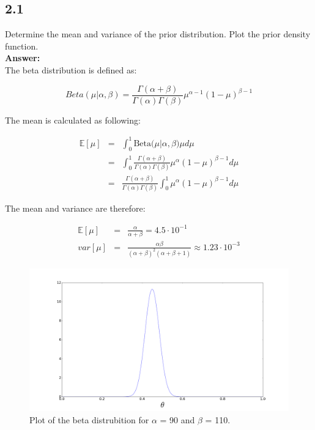\documentclass[a4paper]{article}
\begin{document}
\subsection*{2.1}

Determine the mean and variance of the prior distribution. Plot the prior density function.\\

\textbf{Answer:}\\


The beta distribution is defined as:


\begin{equation}
Beta(\mu|\alpha, \beta) = \frac{\Gamma (\alpha + \beta )}{\Gamma(\alpha) \Gamma(\beta)} \mu^{\alpha - 1}(1-\mu)^{\beta - 1}
\end{equation}


The mean is calculated as following:

\begin{eqnarray}
\mathbb E[\mu] &=& \int_0^{1} \text{Beta(}\mu|\alpha,\beta) \mu d \mu \\
&=& \int_0^1 \frac{\Gamma (\alpha + \beta )}{\Gamma(\alpha) \Gamma(\beta)} \mu^{\alpha}(1-\mu)^{\beta - 1} d\mu \\
&=& \frac{\Gamma (\alpha + \beta )}{\Gamma(\alpha) \Gamma(\beta)} \int_0^1 \mu^{\alpha}(1-\mu)^{\beta - 1} d\mu 
\end{eqnarray}


The mean and variance are therefore:

\begin{eqnarray}
\mathbb E [\mu] &=& \frac{\alpha}{\alpha + \beta } = 4.5\cdot 10^{-1}\\
 var [\mu ] &=& \frac{\alpha \beta}{(\alpha + \beta)^2(\alpha + \beta + 1)} \approx 1.23 \cdot 10^{-3}
\end{eqnarray}

\begin{figure}[H]
\includegraphics[width=\textwidth]{BetaPlotEx2.png}
\caption{Plot of the beta distrubition for $\alpha$ = 90 and $\beta$ = 110.}
\end{figure}
\end{document}
